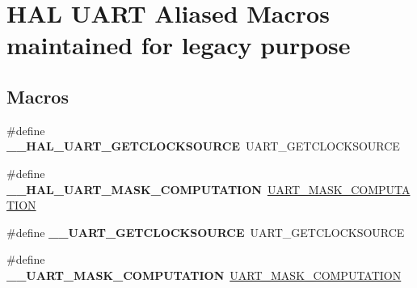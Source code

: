 \hypertarget{group___h_a_l___u_a_r_t___aliased___macros}{}\section{H\+AL U\+A\+RT Aliased Macros maintained for legacy purpose}
\label{group___h_a_l___u_a_r_t___aliased___macros}
\subsection*{Macros}
\begin{DoxyCompactItemize}
\item 
\mbox{\label{group___h_a_l___u_a_r_t___aliased___macros_ga42daa2078cec8482c126dd059211feea}} 
\#define {\bfseries \+\_\+\+\_\+\+H\+A\+L\+\_\+\+U\+A\+R\+T\+\_\+\+G\+E\+T\+C\+L\+O\+C\+K\+S\+O\+U\+R\+CE}~U\+A\+R\+T\+\_\+\+G\+E\+T\+C\+L\+O\+C\+K\+S\+O\+U\+R\+CE
\item 
\mbox{\label{group___h_a_l___u_a_r_t___aliased___macros_gaf30b26158e4eaa99871067016049156d}} 
\#define {\bfseries \+\_\+\+\_\+\+H\+A\+L\+\_\+\+U\+A\+R\+T\+\_\+\+M\+A\+S\+K\+\_\+\+C\+O\+M\+P\+U\+T\+A\+T\+I\+ON}~\hyperlink{group___u_a_r_t_ex___private___macros_gad9330184a8bd9399a36bcc93215a50d1}{U\+A\+R\+T\+\_\+\+M\+A\+S\+K\+\_\+\+C\+O\+M\+P\+U\+T\+A\+T\+I\+ON}
\item 
\mbox{\label{group___h_a_l___u_a_r_t___aliased___macros_ga62b39e2261e76db74c78d6dbdb677937}} 
\#define {\bfseries \+\_\+\+\_\+\+U\+A\+R\+T\+\_\+\+G\+E\+T\+C\+L\+O\+C\+K\+S\+O\+U\+R\+CE}~U\+A\+R\+T\+\_\+\+G\+E\+T\+C\+L\+O\+C\+K\+S\+O\+U\+R\+CE
\item 
\mbox{\label{group___h_a_l___u_a_r_t___aliased___macros_ga4361b9637b14e21ac5a32f8d298bd270}} 
\#define {\bfseries \+\_\+\+\_\+\+U\+A\+R\+T\+\_\+\+M\+A\+S\+K\+\_\+\+C\+O\+M\+P\+U\+T\+A\+T\+I\+ON}~\hyperlink{group___u_a_r_t_ex___private___macros_gad9330184a8bd9399a36bcc93215a50d1}{U\+A\+R\+T\+\_\+\+M\+A\+S\+K\+\_\+\+C\+O\+M\+P\+U\+T\+A\+T\+I\+ON}
\item 
\mbox{\label{group___h_a_l___u_a_r_t___aliased___macros_gaf1bb7de79bc052cd2a1a6671c9c6687d}} 

\end{DoxyCompactItemize}
